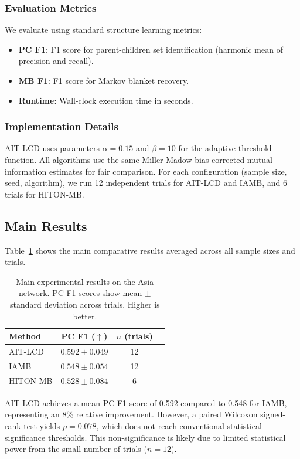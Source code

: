 \documentclass{article}
\theoremstyle{plain}
\theoremstyle{definition}
\begin{document}
\subsubsection{Evaluation Metrics}

We evaluate using standard structure learning metrics:
\begin{itemize}
    \item \textbf{PC F1}: F1 score for parent-children set identification (harmonic mean of precision and recall).
    \item \textbf{MB F1}: F1 score for Markov blanket recovery.
    \item \textbf{Runtime}: Wall-clock execution time in seconds.
\end{itemize}

\subsubsection{Implementation Details}

AIT-LCD uses parameters $\alpha = 0.15$ and $\beta = 10$ for the adaptive threshold function. All algorithms use the same Miller-Madow bias-corrected mutual information estimates for fair comparison. For each configuration (sample size, seed, algorithm), we run 12 independent trials for AIT-LCD and IAMB, and 6 trials for HITON-MB.

\subsection{Main Results}

Table~\ref{tab:main_results} shows the main comparative results averaged across all sample sizes and trials.

\begin{table}[t]
\caption{Main experimental results on the Asia network. PC F1 scores show mean $\pm$ standard deviation across trials. Higher is better.}
\label{tab:main_results}
\centering
\begin{tabular}{lccc}
\toprule
Method & PC F1 ($\uparrow$) & $n$ (trials) \\
\midrule
AIT-LCD & $0.592 \pm 0.049$ & 12 \\
IAMB & $0.548 \pm 0.054$ & 12 \\
HITON-MB & $0.528 \pm 0.084$ & 6 \\
\bottomrule
\end{tabular}
\end{table}

AIT-LCD achieves a mean PC F1 score of 0.592 compared to 0.548 for IAMB, representing an 8\% relative improvement. However, a paired Wilcoxon signed-rank test yields $p = 0.078$, which does not reach conventional statistical significance thresholds. This non-significance is likely due to limited statistical power from the small number of trials ($n = 12$).
\end{document}
